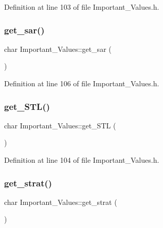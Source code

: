 Definition at line 103 of file Important\+\_\+\+Values.\+h.

\mbox{\label{class_important___values_ab44c0d6647b0a611f8d1bb017cd43635}} 
\subsubsection{\texorpdfstring{get\_sar()}{get\_sar()}}
{\footnotesize\ttfamily char Important\+\_\+\+Values\+::get\+\_\+sar (\begin{DoxyParamCaption}{ }\end{DoxyParamCaption})\hspace{0.3cm}{\ttfamily [inline]}}



Definition at line 106 of file Important\+\_\+\+Values.\+h.

\mbox{\label{class_important___values_aa5c45bac02d2b75175ab647515f8db81}} 
\subsubsection{\texorpdfstring{get\_STL()}{get\_STL()}}
{\footnotesize\ttfamily char Important\+\_\+\+Values\+::get\+\_\+\+S\+TL (\begin{DoxyParamCaption}{ }\end{DoxyParamCaption})\hspace{0.3cm}{\ttfamily [inline]}}



Definition at line 104 of file Important\+\_\+\+Values.\+h.

\mbox{\label{class_important___values_aaddb4a0a6e6804bc316852791271d517}} 
\subsubsection{\texorpdfstring{get\_strat()}{get\_strat()}}
{\footnotesize\ttfamily char Important\+\_\+\+Values\+::get\+\_\+strat (\begin{DoxyParamCaption}{ }\end{DoxyParamCaption})\hspace{0.3cm}{\ttfamily [inline]}}




